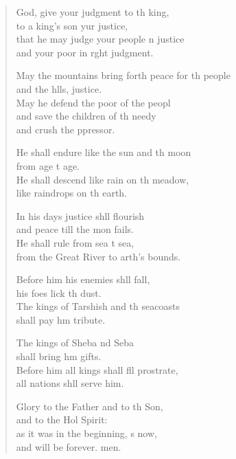 \begin{verse}
  \begin{patverse}
 God, give your judgment to th king,\Med\\
to a king’s son yur justice,\\
that he may judge your people \pointup{\i}n justice\Med\\
and your poor in r\pointup{\i}ght judgment.

May the mountains bring forth peace for th people\Med\\
and the h\pointup{\i}lls, justice.\\
May he defend the poor of the peopl\Flex\\
and save the children of th needy\Med\\
and crush the ppressor.

He shall endure like the sun and th moon\Med\\
from age t age.\\
He shall descend like rain on th meadow,\Med\\
like raindrops on th earth.

In his days justice shll flourish\Med\\
and peace till the mon fails.\\
He shall rule from sea t sea,\Med\\
from the Great River to arth’s bounds.

Before him his enemies shll fall,\Med\\
his foes lick th dust.\\
The kings of Tarshish and th seacoasts\Med\\
shall pay h\pointup{\i}m tribute.

The kings of Sheba nd Seba\Med\\
shall bring h\pointup{\i}m gifts.\\
Before him all kings shall fll prostrate,\Med\\
all nations shll serve him.

Glory to the Father and to th Son,\Med\\
and to the Hol Spirit:\\
as it was in the beginning, \pointup{\i}s now,\Med\\
and will be forever. men.
  \end{patverse}
\end{verse}
